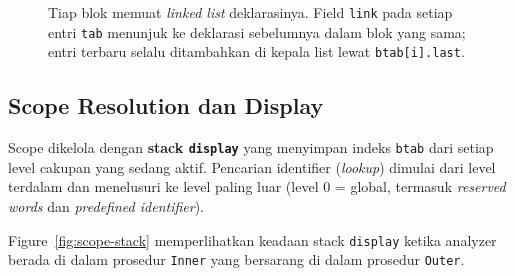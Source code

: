 \documentclass[11pt,a4paper]{article}
\begin{document}
\begin{figure}[H]
\centering
{}
\caption{Tiap blok memuat \textit{linked list} deklarasinya. Field \texttt{link}
pada setiap entri \texttt{tab} menunjuk ke deklarasi sebelumnya dalam blok
yang sama; entri terbaru selalu ditambahkan di kepala list lewat
\texttt{btab[i].last}.}
\label{fig:linked-list}
\end{figure}

\subsection{Scope Resolution dan Display}

Scope dikelola dengan \textbf{stack \texttt{display}} yang menyimpan indeks
\texttt{btab} dari setiap level cakupan yang sedang aktif. Pencarian
identifier (\textit{lookup}) dimulai dari level terdalam dan menelusuri ke
level paling luar (level 0 = global, termasuk \textit{reserved words} dan
\textit{predefined identifier}).

Figure~\ref{fig:scope-stack} memperlihatkan keadaan stack \texttt{display}
ketika analyzer berada di dalam prosedur \texttt{Inner} yang bersarang di
dalam prosedur \texttt{Outer}.
\end{document}
